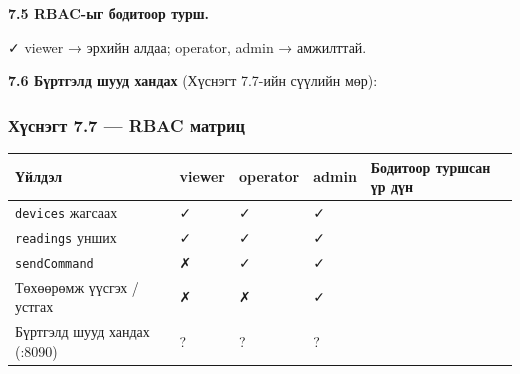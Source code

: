 \textbf{7.5 RBAC-ыг бодитоор турш.}

\begin{Shaded}
\begin{Highlighting}[]
 \KeywordTok{;} 
   
  \VariableTok{$(}  \KeywordTok{\textbackslash{}}
      \KeywordTok{\textbackslash{}}
      \KeywordTok{|} 
\end{Highlighting}
\end{Shaded}

✓ viewer → эрхийн алдаа; operator, admin → амжилттай.

\textbf{7.6 Бүртгэлд шууд хандах} (Хүснэгт 7.7-ийн сүүлийн мөр):

\begin{Shaded}
\begin{Highlighting}[]
\end{Highlighting}
\end{Shaded}

\hypertarget{ux445ux4afux441ux43dux44dux433ux442-7.7-rbac-ux43cux430ux442ux440ux438ux446}{%
\subsubsection{Хүснэгт 7.7 --- RBAC матриц}\label{ux445ux4afux441ux43dux44dux433ux442-7.7-rbac-ux43cux430ux442ux440ux438ux446}}

\begingroup\scriptsize\begin{longtable}[]{@{}lllll@{}}
\toprule
Үйлдэл & viewer & operator & admin & Бодитоор туршсан үр дүн\tabularnewline
\midrule
\endhead
\texttt{devices} жагсаах & ✓ & ✓ & ✓ &\tabularnewline
\texttt{readings} унших & ✓ & ✓ & ✓ &\tabularnewline
\texttt{sendCommand} & ✗ & ✓ & ✓ &\tabularnewline
Төхөөрөмж үүсгэх / устгах & ✗ & ✗ & ✓ &\tabularnewline
Бүртгэлд шууд хандах (:8090) & ? & ? & ? &\tabularnewline
\bottomrule
\end{longtable}\endgroup

